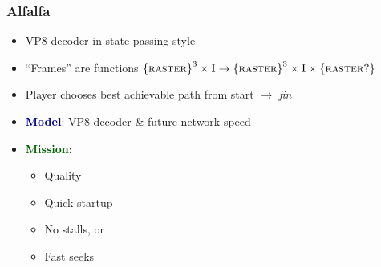 \documentclass[svgnames]{beamer}
\begin{document}
\begin{frame}
\frametitle{Alfalfa}

\large

\begin{itemize}

\item VP8 decoder in state-passing style

\item ``Frames'' are functions $\textsc{\{raster\}}^3 \times \textsc{I} \rightarrow \textsc{\{raster\}}^3 \times \textsc{I} \times \textsc{\{raster?\}}$

\item Player chooses best achievable path from start $\rightarrow$ \textit{fin}

\vspace{\baselineskip}

\item \textcolor{DarkBlue}{\bf Model}: VP8 decoder \& future network speed

\item \textcolor{DarkGreen}{\bf Mission}: 

\begin{itemize}
\item Quality
\item Quick startup
\item No stalls, or
\item Fast seeks
\end{itemize}

\end{itemize}

\end{frame}

\end{document}
